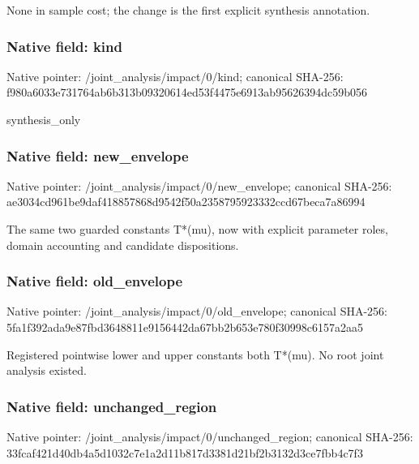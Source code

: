 \documentclass[10pt,a4paper]{article}
\begin{document}
\begingroup\raggedright\sloppy None in sample cost;\allowbreak{} the change is the first explicit synthesis annotation.\par\endgroup

\subsubsection{Native field: kind}
Native pointer: /joint\_\allowbreak{}analysis/impact/0/kind; canonical SHA-256: f980a6033e731764ab6b313b09320614ed53f4475e6913ab95626394dc59b056

\begingroup\raggedright\sloppy synthesis\_\allowbreak{}only\par\endgroup

\subsubsection{Native field: new\_\allowbreak{}envelope}
Native pointer: /joint\_\allowbreak{}analysis/impact/0/new\_\allowbreak{}envelope; canonical SHA-256: ae3034cd961be9daf418857868d9542f50a2358795923332ccd67beca7a86994

\begingroup\raggedright\sloppy The same two guarded constants T*(mu),\allowbreak{} now with explicit parameter roles,\allowbreak{} domain accounting and candidate dispositions.\par\endgroup

\subsubsection{Native field: old\_\allowbreak{}envelope}
Native pointer: /joint\_\allowbreak{}analysis/impact/0/old\_\allowbreak{}envelope; canonical SHA-256: 5fa1f392ada9e87fbd3648811e9156442da67bb2b653e780f30998c6157a2aa5

\begingroup\raggedright\sloppy Registered pointwise lower and upper constants both T*(mu). No root joint analysis existed.\par\endgroup

\subsubsection{Native field: unchanged\_\allowbreak{}region}
Native pointer: /joint\_\allowbreak{}analysis/impact/0/unchanged\_\allowbreak{}region; canonical SHA-256: 33fcaf421d40db4a5d1032c7e1a2d11b817d3381d21bf2b3132d3ce7fbb4c7f3
\end{document}
